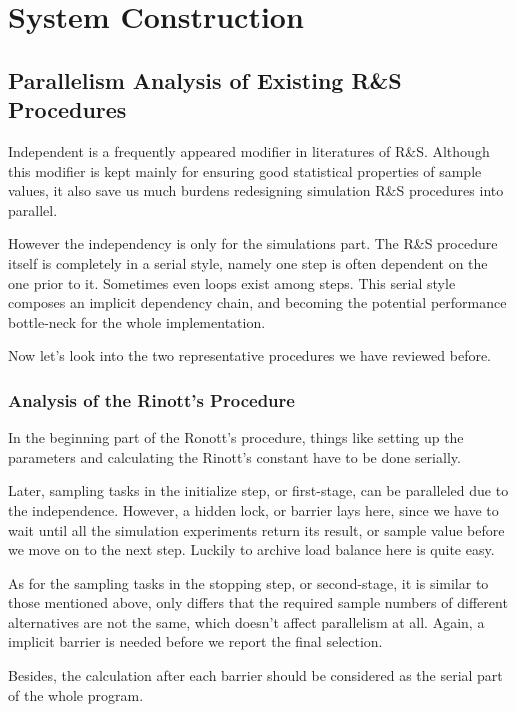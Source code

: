 \chapter{System Construction}

\section{Parallelism Analysis of Existing R\&S Procedures}

Independent is a frequently appeared modifier in literatures of R\&S. Although this modifier is kept mainly for ensuring good statistical properties of sample values, it also save us much burdens redesigning simulation R\&S procedures into parallel.

However the independency is only for the simulations part. The R\&S procedure itself is completely in a serial style, namely one step is often dependent on the one prior to it. Sometimes even loops exist among steps. This serial style composes an implicit dependency chain, and becoming the potential performance bottle-neck for the whole implementation.

Now let's look into the two representative procedures we have reviewed before.

\subsection{Analysis of the Rinott's Procedure}

In the beginning part of the Ronott's procedure, things like setting up the parameters and calculating the Rinott's constant have to be done serially.

Later, sampling tasks in the initialize step, or first-stage, can be paralleled due to the independence. However, a hidden lock, or barrier lays here, since we have to wait until all the simulation experiments return its result, or sample value before we move on to the next step. Luckily to archive load balance here is quite easy.

As for the sampling tasks in the stopping step, or second-stage, it is similar to those mentioned above, only differs that the required sample numbers of different alternatives are not the same, which doesn't affect parallelism at all. Again, a implicit barrier is needed before we report the final selection.

Besides, the calculation after each barrier should be considered as the serial part of the whole program.

